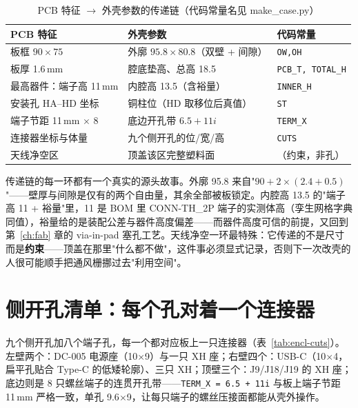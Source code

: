 \begin{table}[htbp]
  \centering
  \caption{PCB 特征 $\to$ 外壳参数的传递链（代码常量名见 make\_case.py）}
  \label{tab:encl-chain}
  \begin{tabular}{llp{3.6cm}}
    \toprule
    PCB 特征 & 外壳参数 & 代码常量 \\
    \midrule
    板框 $90\times75$ & 外廓 $95.8\times80.8$（双壁 + 间隙） & \texttt{OW,OH} \\
    板厚 1.6\,mm & 腔底垫高、总高 18.5 & \texttt{PCB\_T, TOTAL\_H} \\
    最高器件：端子高 11\,mm & 内腔高 13.5（含裕量） & \texttt{INNER\_H} \\
    安装孔 HA--HD 坐标 & 铜柱位（HD 取移位后真值） & \texttt{ST} \\
    端子节距 11\,mm $\times$ 8 & 底边开孔带 $6.5+11i$ & \texttt{TERM\_X} \\
    连接器坐标与体量 & 九个侧开孔的位/宽/高 & \texttt{CUTS} \\
    天线净空区 & 顶盖该区完整塑料面 & （约束，非孔） \\
    \bottomrule
  \end{tabular}
\end{table}

传递链的每一环都有一个真实的源头故事。外廓 95.8 来自"$90 + 2\times(2.4+0.5)$"——壁厚与间隙是仅有的两个自由量，其余全部被板锁定。内腔高 13.5 的"端子高 11 + 裕量"里，11 是 BOM 里 CONN-TH\_2P 端子的实测体高（孪生网格字典同值），裕量给的是装配公差与器件高度偏差——而器件高度可信的前提，又回到第~\ref{ch:fab} 章的 via-in-pad 塞孔工艺。天线净空一环最特殊：它传递的不是尺寸而是\textbf{约束}——顶盖在那里"什么都不做"，这件事必须显式记录，否则下一次改壳的人很可能顺手把通风栅挪过去"利用空间"。

\section{侧开孔清单：每个孔对着一个连接器}
\label{sec:encl-cuts}

九个侧开孔加八个端子孔，每一个都对应板上一只连接器（表~\ref{tab:encl-cuts}）。左壁两个：DC-005 电源座（10$\times$9）与一只 XH 座；右壁四个：USB-C（10$\times$4，扁平孔贴合 Type-C 的低矮轮廓）、三只 XH；顶壁三个：J9/J18/J19 的 XH 座；底边则是 8 只螺丝端子的连贯开孔带——\texttt{TERM\_X = 6.5 + 11i} 与板上端子节距 11\,mm 严格一致，单孔 9.6$\times$9，让每只端子的螺丝压接面都能从壳外操作。

